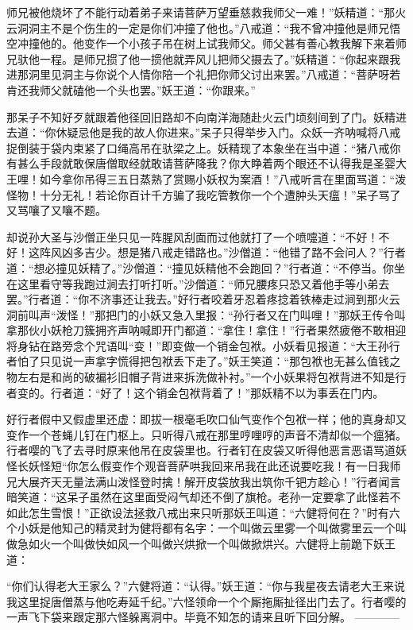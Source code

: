 \documentclass[12pt,UTF8]{ctexbook}
\begin{document}
师兄被他烧坏了不能行动着弟子来请菩萨万望垂慈救我师父一难！”妖精道：“那火云洞洞主不是个伤生的一定是你们冲撞了他也。”八戒道：“我不曾冲撞他是师兄悟空冲撞他的。他变作一个小孩子吊在树上试我师父。师父甚有善心教我解下来着师兄驮他一程。是师兄掼了他一掼他就弄风儿把师父摄去了。”妖精道：“你起来跟我进那洞里见洞主与你说个人情你陪一个礼把你师父讨出来罢。”八戒道：“菩萨呀若肯还我师父就磕他一个头也罢。”妖王道：“你跟来。”

那呆子不知好歹就跟着他径回旧路却不向南洋海随赴火云门顷刻间到了门。妖精进去道：“你休疑忌他是我的故人你进来。”呆子只得举步入门。众妖一齐呐喊将八戒捉倒装于袋内束紧了口绳高吊在驮梁之上。妖精现了本象坐在当中道：“猪八戒你有甚么手段就敢保唐僧取经就敢请菩萨降我？你大睁着两个眼还不认得我是圣婴大王哩！如今拿你吊得三五日蒸熟了赏赐小妖权为案酒！”八戒听言在里面骂道：“泼怪物！十分无礼！若论你百计千方骗了我吃管教你一个个遭肿头天瘟！”呆子骂了又骂嚷了又嚷不题。

却说孙大圣与沙僧正坐只见一阵腥风刮面而过他就打了一个喷嚏道：“不好！不好！这阵风凶多吉少。想是猪八戒走错路也。”沙僧道：“他错了路不会问人？”行者道：“想必撞见妖精了。”沙僧道：“撞见妖精他不会跑回？”行者道：“不停当。你坐在这里看守等我跑过涧去打听打听。”沙僧道：“师兄腰疼只恐又着他手等小弟去罢。”行者道：“你不济事还让我去。”好行者咬着牙忍着疼捻着铁棒走过涧到那火云洞前叫声“泼怪！”那把门的小妖又急入里报：“孙行者又在门叫哩！”那妖王传令叫拿那伙小妖枪刀簇拥齐声呐喊即开门都道：“拿住！拿住！”行者果然疲倦不敢相迎将身钻在路旁念个咒语叫“变！”即变做一个销金包袱。小妖看见报道：“大王孙行者怕了只见说一声拿字慌得把包袱丢下走了。”妖王笑道：“那包袱也无甚么值钱之物左右是和尚的破褊衫旧帽子背进来拆洗做补衬。”一个小妖果将包袱背进不知是行者变的。行者道：“好了！这个销金包袱背着了！”那妖精不以为事丢在门内。

好行者假中又假虚里还虚：即拔一根毫毛吹口仙气变作个包袱一样；他的真身却又变作一个苍蝇儿钉在门枢上。只听得八戒在那里哼哩哼的声音不清却似一个瘟猪。行者嘤的飞了去寻时原来他吊在皮袋里也。行者钉在皮袋又听得他恶言恶语骂道妖怪长妖怪短“你怎么假变作个观音菩萨哄我回来吊我在此还说要吃我！有一日我师兄大展齐天无量法满山泼怪登时擒！解开皮袋放我出筑你千钯方趁心！”行者闻言暗笑道：“这呆子虽然在这里面受闷气却还不倒了旗枪。老孙一定要拿了此怪若不如此怎生雪恨！”正欲设法拯救八戒出来只听那妖王叫道：“六健将何在？”时有六个小妖是他知己的精灵封为健将都有名字：一个叫做云里雾一个叫做雾里云一个叫做急如火一个叫做快如风一个叫做兴烘掀一个叫做掀烘兴。六健将上前跪下妖王道：

“你们认得老大王家么？”六健将道：“认得。”妖王道：“你与我星夜去请老大王来说我这里捉唐僧蒸与他吃寿延千纪。”六怪领命一个个厮拖厮扯径出门去了。行者嘤的一声飞下袋来跟定那六怪躲离洞中。毕竟不知怎的请来且听下回分解。
------------
\end{document}
